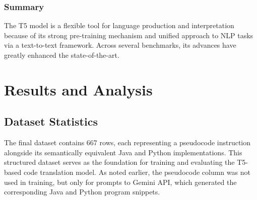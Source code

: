 \documentclass{dhbenelux}
\begin{document}
\subsubsection{Summary}
The T5 model is a flexible tool for language production and interpretation because of its strong pre-training mechanism and unified approach to NLP tasks via a text-to-text framework. Across several benchmarks, its advances have greatly enhanced the state-of-the-art.

\section{Results and Analysis}

\subsection{Dataset Statistics} The final dataset contains 667 rows, each representing a pseudocode instruction alongside its semantically equivalent Java and Python implementations. This structured dataset serves as the foundation for training and evaluating the T5-based code translation model. As noted earlier, the pseudocode column was not used in training, but only for prompts to Gemini API, which generated the corresponding Java and Python program snippets.
\end{document}
